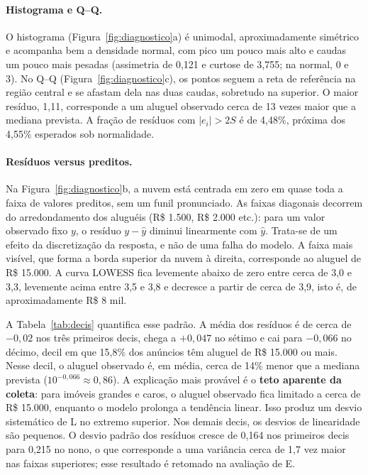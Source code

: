 \documentclass[12pt,a4paper]{article}
\begin{document}
\paragraph{Histograma e Q--Q.} O histograma (Figura~\ref{fig:diagnostico}a) é unimodal, aproximadamente simétrico e acompanha bem a densidade normal, com pico um pouco mais alto e caudas um pouco mais pesadas (assimetria de 0,121 e curtose de 3,755; na normal, 0 e 3). No Q--Q (Figura~\ref{fig:diagnostico}c), os pontos seguem a reta de referência na região central e se afastam dela nas duas caudas, sobretudo na superior. O maior resíduo, 1,11, corresponde a um aluguel observado cerca de 13 vezes maior que a mediana prevista. A fração de resíduos com $|e_i|>2S$ é de 4,48\%, próxima dos 4,55\% esperados sob normalidade.

\paragraph{Resíduos versus preditos.} Na Figura~\ref{fig:diagnostico}b, a nuvem está centrada em zero em quase toda a faixa de valores preditos, sem um funil pronunciado. As faixas diagonais decorrem do arredondamento dos aluguéis (R\$ 1.500, R\$ 2.000 etc.): para um valor observado fixo $y$, o resíduo $y-\widehat{y}$ diminui linearmente com $\widehat{y}$. Trata-se de um efeito da discretização da resposta, e não de uma falha do modelo. A faixa mais visível, que forma a borda superior da nuvem à direita, corresponde ao aluguel de R\$ 15.000. A curva LOWESS fica levemente abaixo de zero entre cerca de 3,0 e 3,3, levemente acima entre 3,5 e 3,8 e decresce a partir de cerca de 3,9, isto é, de aproximadamente R\$ 8 mil.

\begin{table}[H]
\centering
\caption{Resíduos por decil dos valores preditos.}
\label{tab:decis}
\footnotesize

\end{table}

A Tabela~\ref{tab:decis} quantifica esse padrão. A média dos resíduos é de cerca de $-0{,}02$ nos três primeiros decis, chega a $+0{,}047$ no sétimo e cai para $-0{,}066$ no décimo, decil em que 15,8\% dos anúncios têm aluguel de R\$ 15.000 ou mais. Nesse decil, o aluguel observado é, em média, cerca de 14\% menor que a mediana prevista ($10^{-0{,}066}\approx0{,}86$). A explicação mais provável é o \textbf{teto aparente da coleta}: para imóveis grandes e caros, o aluguel observado fica limitado a cerca de R\$ 15.000, enquanto o modelo prolonga a tendência linear. Isso produz um desvio sistemático de L no extremo superior. Nos demais decis, os desvios de linearidade são pequenos. O desvio padrão dos resíduos cresce de 0,164 nos primeiros decis para 0,215 no nono, o que corresponde a uma variância cerca de 1,7 vez maior nas faixas superiores; esse resultado é retomado na avaliação de E.
\end{document}
